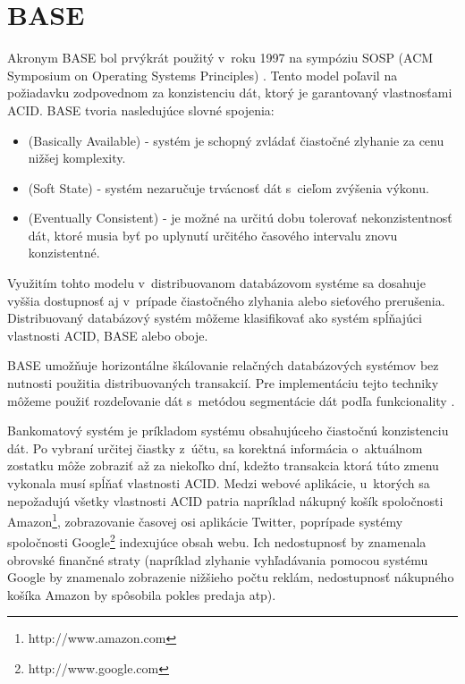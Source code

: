 \documentclass[11pt,twoside,a4paper]{book}
\begin{document}
\section{BASE} %
\label{section:base}
Akronym BASE bol prvýkrát použitý v~roku 1997 na sympóziu SOSP (ACM Symposium on Operating Systems Principles) \cite{fox1997cluster}. Tento model poľavil na požiadavku zodpovednom za konzistenciu dát, ktorý je garantovaný vlastnosťami ACID. BASE tvoria nasledujúce slovné spojenia: 
\begin{itemize}
  \item \emph{} (Basically Available) - systém je schopný zvládať čiastočné zlyhanie za cenu nižšej komplexity.
  \item \emph{} (Soft State) - systém nezaručuje trvácnosť dát s~cieľom zvýšenia výkonu. %
  \item \emph{} (Eventually Consistent) - je možné na určitú dobu tolerovať nekonzistentnosť dát, ktoré musia byť po uplynutí určitého časového intervalu znovu konzistentné.
\end{itemize}

Využitím tohto modelu v~distribuovanom databázovom systéme sa dosahuje vyššia dostupnosť 
aj v~prípade čiastočného zlyhania alebo sieťového prerušenia. Distribuovaný databázový systém môžeme klasifikovať ako systém spĺňajúci vlastnosti ACID, BASE alebo oboje.

BASE umožňuje horizontálne škálovanie relačných databázových systémov bez nutnosti použitia distribuovaných transakcií. Pre implementáciu tejto techniky môžeme použiť rozdeľovanie dát s~metódou segmentácie dát podľa funkcionality \cite{Pritchett:2008:BAA:1394127.1394128}.


Bankomatový systém je príkladom systému obsahujúceho čiastočnú konzistenciu dát. Po vybraní určitej čiastky z~účtu, sa korektná informácia o~aktuálnom zostatku môže zobraziť až za niekoľko dní, kdežto transakcia ktorá túto zmenu vykonala musí spĺňať vlastnosti ACID. Medzi webové aplikácie, u~ktorých sa nepožadujú všetky vlastnosti ACID patria napríklad nákupný košík spoločnosti Amazon\footnote{http://www.amazon.com}, zobrazovanie časovej osi aplikácie Twitter, poprípade systémy spoločnosti Google\footnote{http://www.google.com} indexujúce obsah webu. Ich nedostupnosť by znamenala obrovské finančné straty (napríklad zlyhanie vyhľadávania pomocou systému Google by znamenalo zobrazenie nižšieho počtu reklám, nedostupnosť nákupného košíka Amazon by spôsobila pokles predaja atp).
\end{document}
